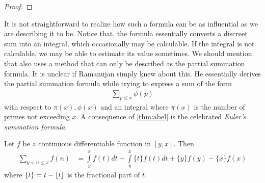 \documentclass[elemannt.tex]{subfile}
\begin{document}
		\begin{proof}

		\end{proof}
	It is not straightforward to realize how such a formula can be as influential as we are describing it to be. Notice that, the formula essentially converts a discreet sum into an integral, which occasionally may be calculable. If the integral is not calculable, we may be able to estimate its value sometimes. We should mention that \textcite[Page $83$, $\S4$]{aiyangar_hardy_vennkatesvara_seshu_aiyar_p_wilson_1927} also uses a method that can only be described as the partial summation formula. It is unclear if Ramanujan simply knew about this. He essentially derives the partial summation formula while trying to express a sum of the form
		\begin{align*}
			\sum_{p\leq x}\phi(p)
		\end{align*}
	with respect to $\pi(x),\phi(x)$ and an integral where $\pi(x)$ is the number of primes not exceeding $x$. A consequence of \autoref{thm:abel} is the celebrated \textit{Euler's summation formula}.
		\begin{theorem}\label{thm:eulersum}
			Let $f$ be a continuous differentiable function in $[y,x]$. Then
				\begin{align*}
					\sum_{y<n\leq x}f(n)
						& = \int\limits_{y}^{x}f(t)dt+\int\limits_{y}^{x}\{t\}f(t)dt+\{y\}f(y)-\{x\}f(x)
				\end{align*}
			where $\{t\}=t-\floor{t}$ is the fractional part of $t$.
		\end{theorem}
\end{document}
